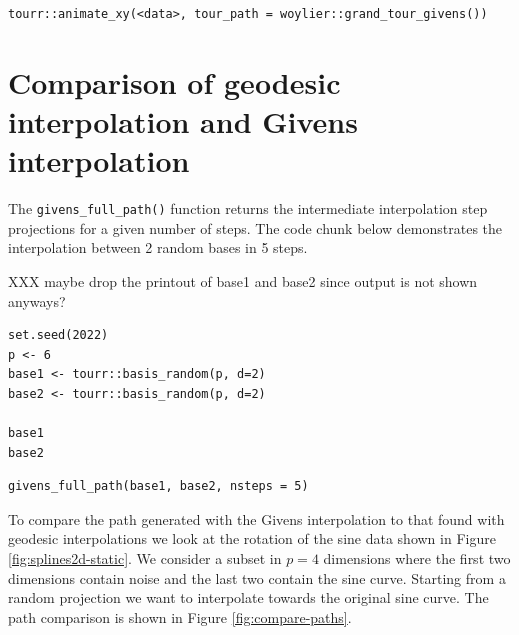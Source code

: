 \begin{verbatim}
tourr::animate_xy(<data>, tour_path = woylier::grand_tour_givens())
\end{verbatim}

\hypertarget{comparison-of-geodesic-interpolation-and-givens-interpolation}{%
\section{Comparison of geodesic interpolation and Givens interpolation}\label{comparison-of-geodesic-interpolation-and-givens-interpolation}}

The \texttt{givens\_full\_path()} function returns the intermediate interpolation step projections for a given number of steps. The code chunk below demonstrates the interpolation between 2 random bases in 5 steps.

XXX maybe drop the printout of base1 and base2 since output is not shown anyways?

\begin{verbatim}
set.seed(2022)
p <- 6
base1 <- tourr::basis_random(p, d=2)
base2 <- tourr::basis_random(p, d=2)

base1
base2
\end{verbatim}

\begin{verbatim}
givens_full_path(base1, base2, nsteps = 5)
\end{verbatim}

To compare the path generated with the Givens interpolation to that found with geodesic interpolations we look at the rotation of the sine data shown in Figure \ref{fig:splines2d-static}. We consider a subset in \(p=4\) dimensions where the first two dimensions contain noise and the last two contain the sine curve. Starting from a random projection we want to interpolate towards the original sine curve. The path comparison is shown in Figure \ref{fig:compare-paths}.

